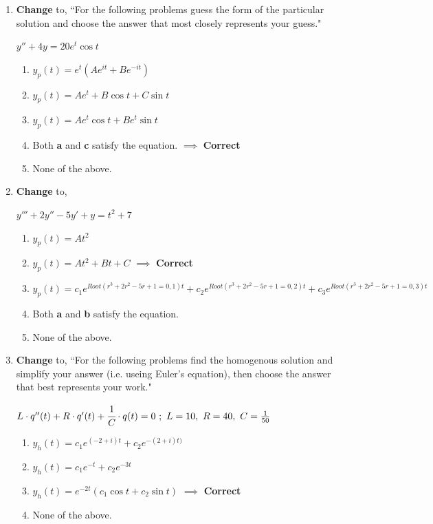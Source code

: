 \documentclass[fleqn]{article}[11pt]
\begin{document}
\begin{enumerate}
	\item \textbf{Change} to, ``For the following problems guess the form of the particular solution and choose the answer that most closely represents your guess."
	
		\(y''+4y=20e^{t}\cos{t}\)
			\begin{enumerate}
				\item $y_{p}(t)=e^{t}(Ae^{{i}t}+Be^{-{i}t})$
				\item $y_{p}(t)=Ae^{t}+B\cos{t}+C\sin{t}$
				\item $y_{p}(t)=Ae^{t}\cos{t}+Be^{t}\sin{t}$
				\item Both \textbf{\textup{a}} and \textbf{\textup{c}} satisfy the equation. $\implies$ \textbf{Correct}
				\item None of the above. 
			\end{enumerate}
	
	\item \textbf{Change} to,
	
		\(y'''+2y''-5y'+y=t^2+7\)
			\begin{enumerate}
				\item $y_{p}(t)=At^2$
				\item $y_{p}(t)=At^2+Bt+C$ $\implies$ \textbf{Correct}
				\item $y_{p}(t)=c_{1}e^{Root(r^{3}+2r^{2}-5r+1=0,1) t}+c_{2}e^{Root(r^{3}+2r^{2}-5r+1=0,2)t}+c_{3}e^{Root(r^{3}+2r^{2}-5r+1=0,3)t}$
				\item Both \textbf{\textup{a}} and \textbf{\textup{b}} satisfy the equation.
				\item None of the above. 
			\end{enumerate}
		
	\item \textbf{Change} to, ``For the following problems find the homogenous solution and simplify your answer (i.e. useing Euler's equation), then choose the answer that best represents your work."
	
		\(L\cdot q''(t)+R\cdot q'(t)+\cfrac{1}{C}\cdot q(t)=0\ ;\ L=10,\ R=40,\ C=\frac{1}{50}\)
			\begin{enumerate}
				\item $y_{h}(t)=c_{1}e^{(-2+i)t}+c_{2}e^{-(2+i)t)}$
				\item $y_{h}(t)=c_{1}e^{-t}+c_{2}e^{-3t}$
				\item $y_{h}(t)=e^{-2t}(c_{1}\cos{t}+c_{2}\sin{t})$ $\implies$ \textbf{Correct}
				\item None of the above.
			\end{enumerate}
			

\end{enumerate}
\end{document}
